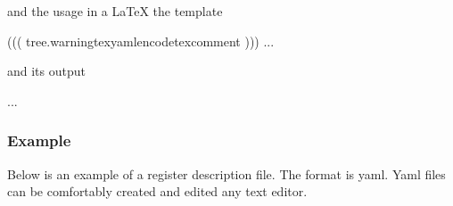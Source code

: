 \documentclass[letterpaper,10pt,english]{sphinxmanual}
\begin{document}
and the usage in a LaTeX the template

\begin{sphinxVerbatim}[commandchars=\\\{\}]
((( tree.warning\textbar{}texyamlencode\textbar{}texcomment )))
...
\end{sphinxVerbatim}

and its output

\begin{sphinxVerbatim}[commandchars=\\\{\}]
...
\end{sphinxVerbatim}


\subsubsection{Example}
\label{\detokenize{user:example}}
Below is an example of a register description file. The format is yaml.
Yaml files can be comfortably created and edited any text editor.
\end{document}
